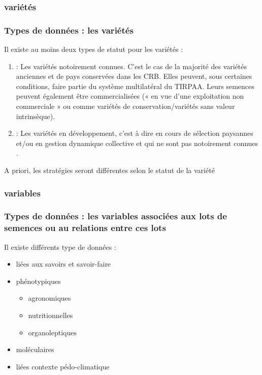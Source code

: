 \subsubsection{variétés}


\begin{frame}
\frametitle{Types de données : les variétés}

Il existe au moins deux types de statut pour les variétés :
\begin{enumerate}
\item {}: Les variétés notoirement connues.
C'est le cas de la majorité des variétés anciennes et de pays conservées dans les CRB. 
Elles peuvent, sous certaines conditions, faire partie du système multilatéral du TIRPAA. 
Leurs semences peuvent également être commercialisées (« en vue d'une exploitation non commerciale » ou comme variétés de conservation/variétés sans valeur intrinsèque).

\item {}: Les variétés en développement, c'est à dire en cours de sélection paysannes et/ou en gestion dynamique collective et qui ne sont pas notoirement connues . 

\end{enumerate}


\vfil

\begin{block}{}
\centering
A priori, les stratégies seront différentes selon le statut de la variété
\end{block}

\end{frame}


\subsubsection{variables}

\begin{frame}
\frametitle{Types de données : les variables associées aux lots de semences ou au relations entre ces
lots}

Il existe différents type de données :

\begin{itemize}
\item liées aux savoirs et savoir-faire
\item phénotypiques 
	\begin{itemize}
	\item agronomiques
	\item nutritionnelles
	\item organoleptiques
	\end{itemize}
\item moléculaires
\item liées contexte pédo-climatique
\end{itemize}

\end{frame}


